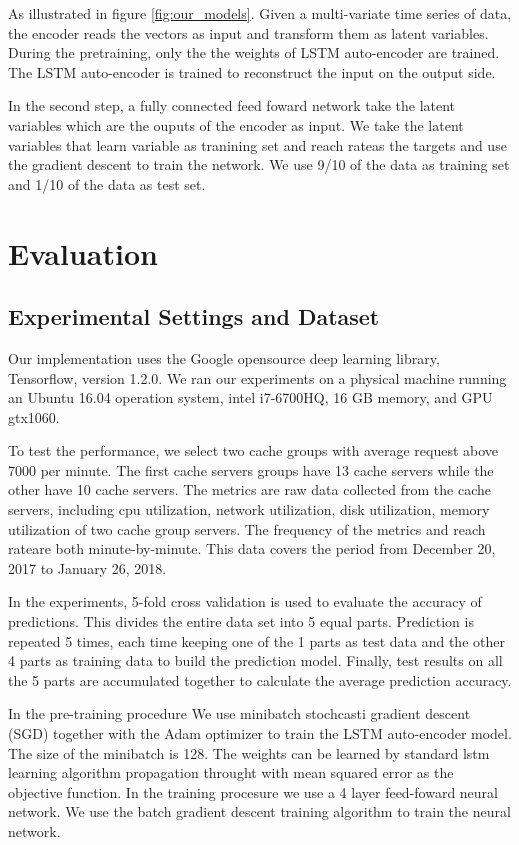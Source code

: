 \documentclass[5p]{elsarticle}
\newcommand{\dabiaolv}{reach rate}
\begin{document}
As illustrated in figure \ref{fig:our_models}. Given a multi-variate time series of data, the encoder reads the vectors as input and transform them as latent variables. During the pretraining, only the the weights of LSTM auto-encoder are trained. The LSTM auto-encoder is trained to reconstruct the input on the output side. 

In the second step, a fully connected feed foward network take the latent variables which are the ouputs of the encoder as input. We take the latent variables that learn variable as tranining set and \dabiaolv as the targets and use the gradient descent to train the network. We use 9/10 of the data as training set and 1/10 of the data as test set.

\section{Evaluation}
\subsection{Experimental Settings and Dataset}
Our implementation uses the Google opensource deep learning library, Tensorflow\cite{TensorFlow}, version 1.2.0. We ran our experiments on a physical machine running an Ubuntu 16.04 operation system, intel i7-6700HQ, 16 GB memory, and GPU gtx1060.

To test the performance, we select two cache groups with average request above 7000 per minute. The first cache servers groups have 13 cache servers while the other have 10 cache servers. The  metrics are raw data collected from the cache servers, including cpu utilization, network utilization, disk utilization, memory utilization of two cache group servers. The frequency of the metrics and  \dabiaolv are both minute-by-minute. This data covers the period from December 20, 2017 to January 26, 2018.

In the experiments, 5-fold cross validation is used to evaluate the accuracy of predictions. This divides the entire data set into 5 equal parts.  Prediction is repeated 5 times, each time keeping one of the 1 parts as test data and the other 4 parts as training data to build the prediction model. Finally, test results on all the 5 parts are accumulated together to calculate the average prediction accuracy.

In the pre-training procedure We use minibatch stochcasti gradient descent (SGD) together with the Adam optimizer to train the LSTM auto-encoder model. The size of the minibatch is 128. The weights can be learned by standard lstm learning algorithm propagation throught with mean squared error as the objective function. In the training procesure we use a 4 layer feed-foward neural network. We use the batch gradient descent training algorithm to train the neural network.
\end{document}
